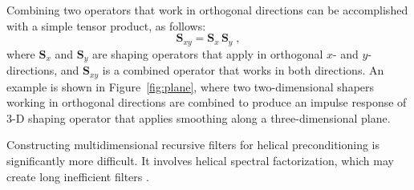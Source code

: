 Combining two operators that work in orthogonal directions can be
accomplished with a simple tensor product, as follows:
\begin{equation}
  \label{eq:xy}
  \mathbf{S}_{xy} = \mathbf{S}_{x}\,\mathbf{S}_{y}\;,
\end{equation}
where $\mathbf{S}_{x}$ and $\mathbf{S}_{y}$ are shaping operators that apply
in orthogonal $x$- and $y$-directions, and $\mathbf{S}_{xy}$ is a combined
operator that works in both directions. An example is shown in
Figure~\ref{fig:plane}, where two two-dimensional shapers working in
orthogonal directions are combined to produce an impulse response of 3-D
shaping operator that applies smoothing along a three-dimensional plane.


Constructing multidimensional recursive filters for helical
preconditioning \cite[]{GEO68-02-05770588} is significantly more
difficult. It involves helical spectral factorization, which may
create long inefficient filters \cite[]{burg}.

